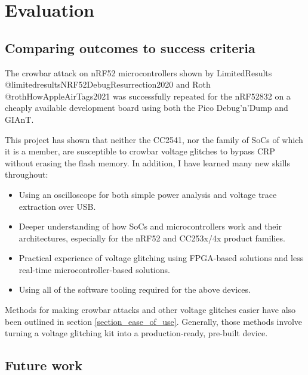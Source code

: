 \newpage

\hypertarget{evaluation}{%
\section{Evaluation}\label{evaluation}}

\hypertarget{comparing-outcomes-to-success-criteria}{%
\subsection{Comparing outcomes to success
criteria}\label{comparing-outcomes-to-success-criteria}}

The crowbar attack on nRF52 microcontrollers shown by LimitedResults
@limitedresultsNRF52DebugResurrection2020 and Roth
@rothHowAppleAirTags2021 was successfully repeated for the nRF52832 on a
cheaply available development board using both the Pico Debug'n'Dump and
GIAnT.

This project has shown that neither the CC2541, nor the family of SoCs
of which it is a member, are susceptible to crowbar voltage glitches to
bypass CRP without erasing the flash memory. In addition, I have learned
many new skills throughout:

\begin{itemize}
\tightlist
\item
  Using an oscilloscope for both simple power analysis and voltage trace
  extraction over USB.
\item
  Deeper understanding of how SoCs and microcontrollers work and their
  architectures, especially for the nRF52 and CC253x/4x product
  families.
\item
  Practical experience of voltage glitching using FPGA-based solutions
  and less real-time microcontroller-based solutions.
\item
  Using all of the software tooling required for the above devices.
\end{itemize}

Methods for making crowbar attacks and other voltage glitches easier
have also been outlined in section \ref{section_ease_of_use}. Generally,
those methods involve turning a voltage glitching kit into a
production-ready, pre-built device.

\hypertarget{future-work}{%
\subsection{Future work}\label{future-work}}

